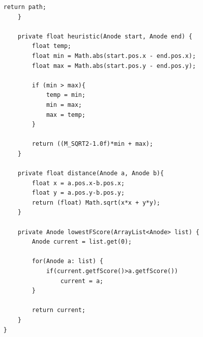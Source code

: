 \documentclass[12pt, 
openright, 
oneside, 
a4paper,    
brazil]{facom-ufu-abntex2}
\begin{document}
\begin{apendicesenv}
\begin{lstlisting}[caption=A* adaptado]
		return path;
	}
	
	private float heuristic(Anode start, Anode end) {
		float temp;
		float min = Math.abs(start.pos.x - end.pos.x);
		float max = Math.abs(start.pos.y - end.pos.y);
		
		if (min > max){
			temp = min;
			min = max;
			max = temp;
		}
		
		return ((M_SQRT2-1.0f)*min + max);
	}
	
	private float distance(Anode a, Anode b){
		float x = a.pos.x-b.pos.x;
		float y = a.pos.y-b.pos.y;
		return (float) Math.sqrt(x*x + y*y);
	}
	
	private Anode lowestFScore(ArrayList<Anode> list) {
		Anode current = list.get(0);
		
		for(Anode a: list) {
			if(current.getfScore()>a.getfScore())
				current = a;
		}
		
		return current;
	}
}

\end{lstlisting}



\end{apendicesenv}












\printindex
\end{document}
